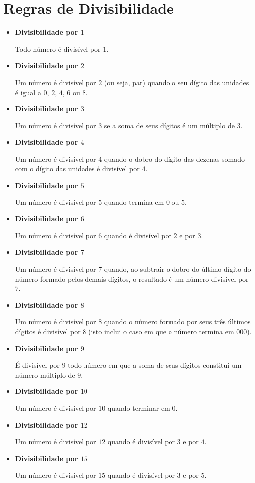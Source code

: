 \chapter{Regras de Divisibilidade}
 \begin{itemize}
  \item \textbf{Divisibilidade por $1$}

 Todo número é divisível por $1$.

 \item \textbf{Divisibilidade por $2$}

 Um número é divisível por $2$ (ou seja, par) quando o seu dígito das unidades é igual a $0$, $2$, $4$, $6$ ou $8$.

 \item \textbf{Divisibilidade por $3$}

 Um número é divisível por $3$ se a soma de seus dígitos é um múltiplo de $3$.

 \item \textbf{Divisibilidade por $4$}

 Um número é divisível por $4$ quando o dobro do dígito das dezenas somado com o dígito das unidades é divisível por $4$.

 \item \textbf{Divisibilidade por $5$}

 Um número é divisível por $5$ quando termina em $0$ ou $5$.

 \item \textbf{Divisibilidade por $6$}

 Um número é divisível por $6$ quando é divisível por $2$ e por $3$.

 \item \textbf{Divisibilidade por $7$}

 Um número é divisível por $7$ quando, ao subtrair o dobro do último dígito do número formado pelos demais dígitos, o resultado é um número divisível por $7$.

 \item \textbf{Divisibilidade por $8$}

 Um número é divisível por $8$ quando o número formado por seus três últimos dígitos é divisível por $8$ (isto inclui o caso em que o número termina em $000$).

 \item \textbf{Divisibilidade por $9$}

 É divisível por $9$ todo número em que a soma de seus dígitos constitui um número múltiplo de $9$.

 \item \textbf{Divisibilidade por $10$}

 Um número é divisível por $10$ quando terminar em $0$.

 \item \textbf{Divisibilidade por $12$}

 Um número é divisível por $12$ quando é divisível por $3$ e por $4$.

 \item \textbf{Divisibilidade por $15$}

 Um número é divisível por $15$ quando é divisível por $3$ e por $5$.
 \end{itemize}